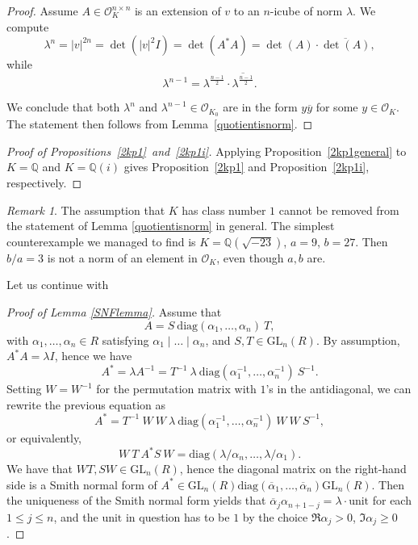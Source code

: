 \documentclass[11pt]{amsart}
\newcommand{\diag}{\mathrm{diag}}
\newcommand{\QQ}{\mathbb{Q}}
\newcommand{\GL}{\mathrm{GL}}
\theoremstyle{definition}
\theoremstyle{remark}
\newtheorem{remark}[proposition]{Remark}
\begin{document}
\begin{proof}
Assume $A\in \mathcal{O}_K^{n\times n}$ is an extension of $v$ to an $n$-icube of norm $\lambda$. We compute
\[\lambda^n = |v|^{2n}=\det(|v|^2 I) = \det(A^*A) = \det(A)\cdot \overline{\det(A)},\]
while
\[\lambda^{n-1}=\lambda^{\frac{n-1}{2}}\cdot \overline{\lambda^{\frac{n-1}{2}}}.\]

We conclude that both $\lambda^n$ and $\lambda^{n-1}\in \mathcal{O}_{K_0}$ are in the form $y\overline y$ for some $y\in \mathcal{O}_K$. The statement then follows from Lemma~\ref{quotientisnorm}.
\end{proof}


\begin{proof}[Proof of Propositions~\ref{2kp1}~and~\ref{2kp1i}] Applying Proposition~\ref{2kp1general} to $K=\QQ$ and $K=\QQ(i)$ gives Proposition~\ref{2kp1} and Proposition~\ref{2kp1i}, respectively.
\end{proof}


\begin{remark} The assumption that $K$ has class number $1$ cannot be removed 
from the statement of Lemma \ref{quotientisnorm} in general. The simplest counterexample we managed to find is $K=\QQ(\sqrt{-23})$, $a=9$, $b=27$. Then $b/a=3$ is not a norm of an element in $\mathcal{O}_K$, even though $a,b$ are.
\end{remark}


Let us continue with
\begin{proof}[Proof of Lemma \ref{SNFlemma}] Assume that
\[
A=S\ \diag(\alpha_1,\dotsc,\alpha_n)\ T,
\]
with $\alpha_1,\dotsc,\alpha_n\in R$ satisfying $\alpha_1\mid \dotsc\mid \alpha_n$, and $S,T\in\GL_n(R)$. By assumption, $A^*A=\lambda I$, hence we have
\[
A^*=\lambda A^{-1} = T^{-1}\ \lambda\ \diag(\alpha_1^{-1},\dotsc,\alpha_n^{-1})\ S^{-1}.
\]
Setting $W=W^{-1}$ for the permutation matrix with $1$'s in the antidiagonal, we can rewrite the previous equation as
\[
A^*=T^{-1}\ W\ W\ \lambda\ \diag(\alpha_1^{-1},\dotsc,\alpha_n^{-1})\ W\ W\ S^{-1},
\]
or equivalently,
\[
W\ T\ A^*S\ W=\diag(\lambda/\alpha_n,\dotsc,\lambda/\alpha_1).
\]
We have that $WT,SW\in\GL_n(R)$, hence the diagonal matrix on the right-hand side is a Smith normal form of $A^*\in \GL_n(R)\diag(\overline\alpha_1,\dotsc,\overline\alpha_n)\GL_n(R)$. Then the uniqueness of the Smith normal form yields that $\overline\alpha_j \alpha_{n+1-j} = \lambda \cdot \text{unit}$ for each $1\leq j\leq n$, and the $\text{unit}$ in question has to be $1$ by the choice $\Re\alpha_j>0$, $\Im\alpha_j\geq 0$.
\end{proof}
\end{document}
